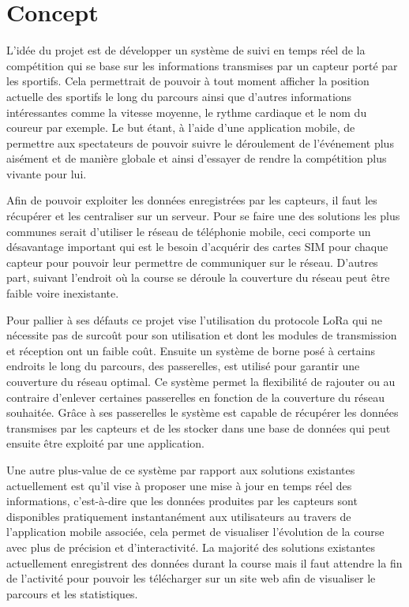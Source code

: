 \chapter{Concept}

L’idée du projet est de développer un système de suivi en temps réel de la compétition qui se base sur les informations transmises par un capteur porté par les sportifs. Cela permettrait de pouvoir à tout moment afficher la position actuelle des sportifs le long du parcours ainsi que d’autres informations intéressantes comme la vitesse moyenne, le rythme cardiaque et le nom du coureur par exemple. Le but étant, à l’aide d’une application mobile, de permettre aux spectateurs de pouvoir suivre le déroulement de l’événement plus aisément et de manière globale et ainsi d’essayer de rendre la compétition plus vivante pour lui.

Afin de pouvoir exploiter les données enregistrées par les capteurs, il faut les récupérer et les centraliser sur un serveur. Pour se faire une des solutions les plus communes serait d’utiliser le réseau de téléphonie mobile, ceci comporte un désavantage important qui est le besoin d’acquérir des cartes SIM pour chaque capteur pour pouvoir leur permettre de communiquer sur le réseau. D’autres part, suivant l’endroit où la course se déroule la couverture du réseau peut être faible voire inexistante. 

Pour pallier à ses défauts ce projet vise l’utilisation du protocole LoRa qui ne nécessite pas de surcoût pour son utilisation et dont les modules de transmission et réception ont un faible coût. Ensuite un système de borne posé à certains endroits le long du parcours, des passerelles, est utilisé pour garantir une couverture du réseau optimal. Ce système permet la flexibilité de rajouter ou au contraire d’enlever certaines passerelles en fonction de la couverture du réseau souhaitée. Grâce à ses passerelles le système est capable de récupérer les données transmises par les capteurs et de les stocker dans une base de données qui peut ensuite être exploité par une application.

Une autre plus-value de ce système par rapport aux solutions existantes actuellement est qu’il vise à proposer une mise à jour en temps réel des informations, c’est-à-dire que les données produites par les capteurs sont disponibles pratiquement instantanément aux utilisateurs au travers de l’application mobile associée, cela permet de visualiser l’évolution de la course avec plus de précision et d’interactivité. La majorité des solutions existantes actuellement enregistrent des données durant la course mais il faut attendre la fin de l’activité pour pouvoir les télécharger sur un site web afin de visualiser le parcours et les statistiques.